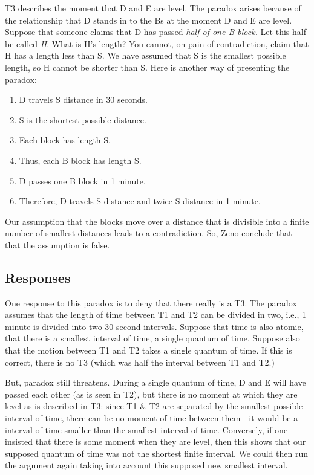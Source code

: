 \documentclass[oneside]{article}
\begin{document}
\noindent T3 describes the moment that D and E are level. The paradox arises because of the relationship that D stands in to the Bs at the moment D and E are level. Suppose that someone claims that D has passed \emph{half
of one B block.} Let this half be called \emph{H}. What is H's length?
You cannot, on pain of contradiction, claim that H has a length less
than S. We have assumed that S is the smallest possible length, so H
cannot be shorter than S. Here is another way of presenting the paradox:

\begin{enumerate}
\item D travels S distance in 30 seconds. 
\item S is the shortest possible distance. 
\item Each block has length-S.
\item Thus, each B block has length S.
\item D passes one B block in 1 minute. 
\item Therefore, D travels S distance and twice S distance in 1 minute. 
\end{enumerate} 
Our assumption that the blocks move over a distance that is divisible into a finite number of smallest distances leads to a contradiction. So, Zeno conclude that that the assumption is false. 

\subsection*{Responses}

One response to this paradox is to deny that there really is a T3. The paradox assumes that the length of time between T1 and T2 can be divided in two, i.e., 1 minute is divided into two 30
second intervals. Suppose that time is also atomic, that there is a
smallest interval of time, a single quantum of time. Suppose also that
the motion between T1 and T2 takes a single quantum of time. If this is
correct, there is no T3 (which was half the interval between T1 and T2.) 

But, paradox still threatens. During a single quantum of time, D and E will
have passed each other (as is seen in T2), but there is no moment at
which they are level as is described in T3: since T1 \& T2 are
separated by the smallest possible interval of time, there can be no moment of time between them---it would be a interval of time smaller than the smallest interval of time. Conversely, if one insisted that there is some moment when they are level, then this shows that our supposed quantum of time was not the shortest finite interval. We could then run the argument again taking into account this supposed new smallest interval.
\end{document}
